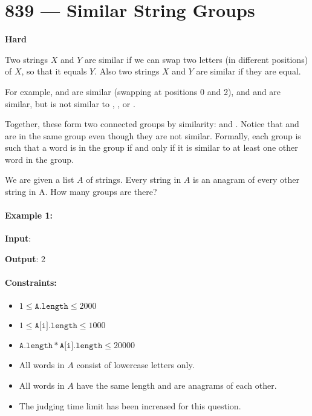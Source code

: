 \section{839 --- Similar String Groups}

\textbf{Hard}

Two strings $X$ and $Y$ are similar if we can swap two letters (in different positions) of $X$, so that it equals $Y$. Also two strings $X$ and $Y$ are similar if they are equal.

For example,  and  are similar (swapping at positions 0 and 2), and  and  are similar, but  is not similar to , , or .

Together, these form two connected groups by similarity:  and .  Notice that  and  are in the same group even though they are not similar.  Formally, each group is such that a word is in the group if and only if it is similar to at least one other word in the group.

We are given a list $A$ of strings.  Every string in $A$ is an anagram of every other string in A.  How many groups are there?

 

\paragraph{Example 1:}

\begin{flushleft}
\textbf{Input}: 

\textbf{Output}: 2
\end{flushleft}
 

\paragraph{Constraints:}

\begin{itemize}
\item $1 \leq \texttt{A.length} \leq 2000$
\item $ 1 \leq \texttt{A[i].length} \leq 1000 $
\item $\texttt{A.length} \ast \texttt{A[i].length} \leq 20000$
\item All words in $A$ consist of lowercase letters only.
\item All words in $ A $ have the same length and are anagrams of each other.
\item The judging time limit has been increased for this question.
\end{itemize}